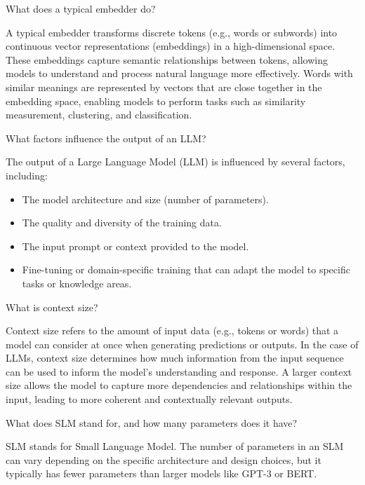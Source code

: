 \begin{ejercicio}
    What does a typical embedder do?

    A typical embedder transforms discrete tokens (e.g., words or subwords) into continuous vector representations (embeddings) in a high-dimensional space. These embeddings capture semantic relationships between tokens, allowing models to understand and process natural language more effectively. Words with similar meanings are represented by vectors that are close together in the embedding space, enabling models to perform tasks such as similarity measurement, clustering, and classification.
\end{ejercicio}

\begin{ejercicio}
    What factors influence the output of an LLM?

    The output of a Large Language Model (LLM) is influenced by several factors, including:
    \begin{itemize}
        \item The model architecture and size (number of parameters).
        \item The quality and diversity of the training data.
        \item The input prompt or context provided to the model.
        \item Fine-tuning or domain-specific training that can adapt the model to specific tasks or knowledge areas.
    \end{itemize}
\end{ejercicio}

\begin{ejercicio}
    What is context size?

    Context size refers to the amount of input data (e.g., tokens or words) that a model can consider at once when generating predictions or outputs. In the case of LLMs, context size determines how much information from the input sequence can be used to inform the model's understanding and response. A larger context size allows the model to capture more dependencies and relationships within the input, leading to more coherent and contextually relevant outputs.
\end{ejercicio}

\begin{ejercicio}
    What does SLM stand for, and how many parameters does it have?

    SLM stands for Small Language Model. The number of parameters in an SLM can vary depending on the specific architecture and design choices, but it typically has fewer parameters than larger models like GPT-3 or BERT.
\end{ejercicio}

